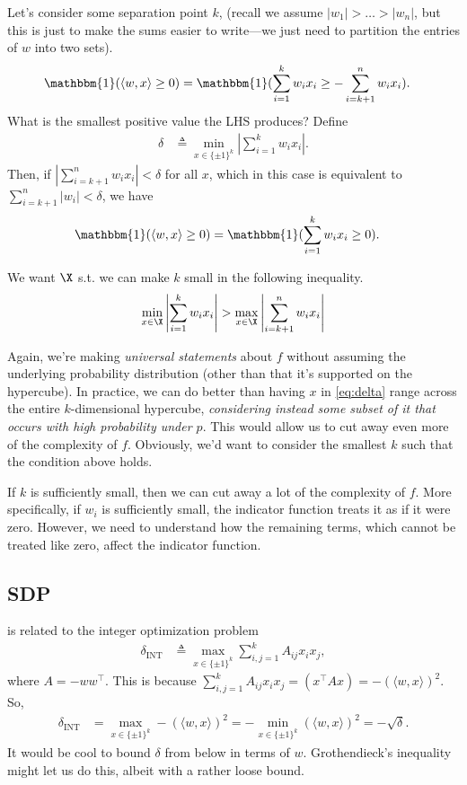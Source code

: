\documentclass{article}
\begin{document}
Let's consider some separation point $k$, (recall we assume $|w_1| > \ldots > |w_n|$, but this is just to make the sums easier to write—we just need to partition the entries of $w$ into two sets).
\begin{align*}
  \mathbbm{1}(\langle w, x \rangle \geq 0)
  &= \mathbbm{1}( \sum_{i=1}^{k} w_i x_i \geq - \sum_{i=k+1}^{n} w_i x_i ).
\end{align*}
What is the smallest positive value the LHS produces?
Define
\begin{align}
  \delta &\triangleq \min_{x \in \{ \pm 1 \}^k} \left| \sum_{i=1}^{k} w_i x_i \right|. \label{eq:delta}
\end{align}
Then, if $\left| \sum_{i=k+1}^{n} w_i x_i \right| < \delta$ for all $x$, which in this case is equivalent to $\sum_{i=k+1}^{n} \left| w_i \right| < \delta$, we have
\begin{align*}
  \mathbbm{1}(\langle w, x \rangle \geq 0)
  &= \mathbbm{1}( \sum_{i=1}^{k} w_i x_i \geq 0 ).
\end{align*}

We want $\X$ s.t. we can make $k$ small in the following inequality.
\begin{align*}
  \min_{x \in \X} \left| \sum_{i=1}^{k} w_i x_i \right| > \max_{x \in \X} \left| \sum_{i=k+1}^{n} w_i x_i \right| 
\end{align*}


Again, we're making \emph{universal statements} about $f$ without assuming the underlying probability distribution (other than that it's supported on the hypercube).
In practice, we can do better than having $x$ in \cref{eq:delta} range across the entire $k$-dimensional hypercube, \emph{considering instead some subset of it that occurs with high probability under $p$}.
This would allow us to cut away even more of the complexity of $f$.
Obviously, we'd want to consider the smallest $k$ such that the condition above holds.

If $k$ is sufficiently small, then we can cut away a lot of the complexity of $f$.
More specifically, if $w_i$ is sufficiently small, the indicator function treats it as if it were zero.
However, we need to understand how the remaining terms, which cannot be treated like zero, affect the indicator function.

\subsection*{SDP}
 is related to the integer optimization problem
\begin{align*}
  \delta_\text{INT} &\triangleq \max_{x \in \{ \pm 1 \}^k} \sum_{i,j=1}^{k} A_{ij} x_i x_j,
\end{align*}
where $A = -w w^\top$.
This is because $\sum_{i,j=1}^{k} A_{ij} x_i x_j = (x^\top A x) = - (\langle w, x \rangle)^2$.
So,
\begin{align*}
  \delta_\text{INT}
  &= \max_{x \in \{ \pm 1 \}^k} - (\langle w, x \rangle)^2
  = - \min_{x \in \{ \pm 1 \}^k} (\langle w, x \rangle)^2
  = - \sqrt{\delta}.
\end{align*}
It would be cool to bound $\delta$ from below in terms of $w$.
Grothendieck's inequality might let us do this, albeit with a rather loose bound.
\end{document}
